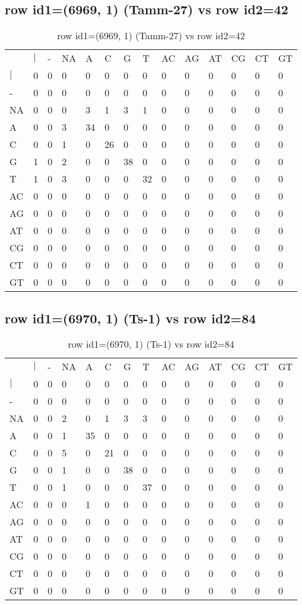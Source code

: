 \subsection{row id1=(6969, 1) (Tamm-27) vs row id2=42}
\begin{center}
\begin{longtable}{|l|l|l|l|l|l|l|l|l|l|l|l|l|l|}
\caption{row id1=(6969, 1) (Tamm-27) vs row id2=42} \label{table_dm180}\\
\hline
\\
\hline
&$|$&-&NA&A&C&G&T&AC&AG&AT&CG&CT&GT\\
$|$&0&0&0&0&0&0&0&0&0&0&0&0&0\\
-&0&0&0&0&0&0&0&0&0&0&0&0&0\\
NA&0&0&0&3&1&3&1&0&0&0&0&0&0\\
A&0&0&3&34&0&0&0&0&0&0&0&0&0\\
C&0&0&1&0&26&0&0&0&0&0&0&0&0\\
G&1&0&2&0&0&38&0&0&0&0&0&0&0\\
T&1&0&3&0&0&0&32&0&0&0&0&0&0\\
AC&0&0&0&0&0&0&0&0&0&0&0&0&0\\
AG&0&0&0&0&0&0&0&0&0&0&0&0&0\\
AT&0&0&0&0&0&0&0&0&0&0&0&0&0\\
CG&0&0&0&0&0&0&0&0&0&0&0&0&0\\
CT&0&0&0&0&0&0&0&0&0&0&0&0&0\\
GT&0&0&0&0&0&0&0&0&0&0&0&0&0\\
\hline
\end{longtable}
\end{center}

\subsection{row id1=(6970, 1) (Ts-1) vs row id2=84}
\begin{center}
\begin{longtable}{|l|l|l|l|l|l|l|l|l|l|l|l|l|l|}
\caption{row id1=(6970, 1) (Ts-1) vs row id2=84} \label{table_dm182}\\
\hline
\\
\hline
&$|$&-&NA&A&C&G&T&AC&AG&AT&CG&CT&GT\\
$|$&0&0&0&0&0&0&0&0&0&0&0&0&0\\
-&0&0&0&0&0&0&0&0&0&0&0&0&0\\
NA&0&0&2&0&1&3&3&0&0&0&0&0&0\\
A&0&0&1&35&0&0&0&0&0&0&0&0&0\\
C&0&0&5&0&21&0&0&0&0&0&0&0&0\\
G&0&0&1&0&0&38&0&0&0&0&0&0&0\\
T&0&0&1&0&0&0&37&0&0&0&0&0&0\\
AC&0&0&0&1&0&0&0&0&0&0&0&0&0\\
AG&0&0&0&0&0&0&0&0&0&0&0&0&0\\
AT&0&0&0&0&0&0&0&0&0&0&0&0&0\\
CG&0&0&0&0&0&0&0&0&0&0&0&0&0\\
CT&0&0&0&0&0&0&0&0&0&0&0&0&0\\
GT&0&0&0&0&0&0&0&0&0&0&0&0&0\\
\hline
\end{longtable}
\end{center}

